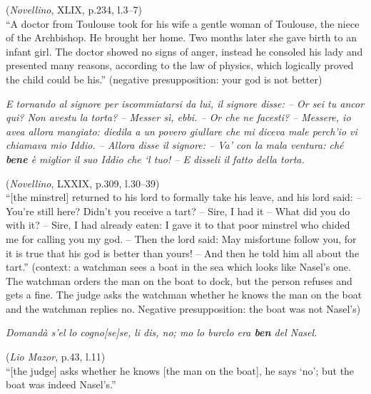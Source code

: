 \documentclass[output=paper]{langsci/langscibook}
\begin{document}
        (\emph{Novellino}, XLIX, p.234, l.3--7)\\
        \enquote{A doctor from Toulouse took for his wife a gentle woman of Toulouse,
        the niece of the Archbishop. He brought her home. Two months later she
        gave birth to an infant girl. The doctor showed no signs of anger,
        instead he consoled his lady and presented many reasons, according to
    the law of physics, which logically proved the child could be his.}
	\z
\ex \label{ex:schifano:12.8}(negative presupposition: your god is not better)\\
    \begin{otherlanguage}{italian}\emph{E tornando al signore per iscommiatarsi da lui, il
            signore disse: – Or sei tu ancor qui? Non avestu la torta? – Messer
            sì, ebbi. – Or che ne facesti? – Messere, io avea allora mangiato:
            diedila a un povero giullare che mi diceva male perch’io vi
            chiamava mio Iddio. – Allora disse il signore: – Va’ con la mala
    ventura: ché \textbf{bene} è miglior il suo Iddio che ‘l tuo! – E disseli
    il fatto della torta.}\end{otherlanguage}\hfill
    (\emph{Novellino}, LXXIX, p.309, l.30--39)\\
    \enquote{[the minstrel] returned to his lord to formally take his leave,
    and his lord said: -- You’re still here? Didn’t you receive a tart?
    -- Sire, I had it -- What did you do with it? -- Sire, I had already
    eaten: I gave it to that poor minstrel who chided me for calling you my
    god. -- Then the lord said: May misfortune follow you, for it is true that
    his god is better than yours! -- And then he told him all about the tart.}
\ex \label{ex:schifano:12.9}
    (context: a watchman sees a boat in the sea which looks like Nasel’s one.
    The watchman orders the man on the boat to dock, but the person refuses and
    gets a fine. The judge asks the watchman whether he knows the man on the
    boat and the watchman replies no. Negative presupposition: the boat was not
    Nasel’s)\\
    \begin{otherlanguage}{italian}\emph{Domandà s’el lo cogno[se]se, li dis, no; mo lo burclo
    era \textbf{ben} del Nasel.}\end{otherlanguage}\hfill
	(\emph{Lio Mazor}, p.43, l.11)\\
    \enquote{[the judge] asks whether he knows [the man on the boat], he says
    \enquote*{no}; but the boat was indeed Nasel’s.}
\ex \label{ex:schifano:12.10}
\end{document}
